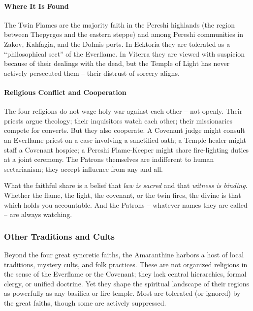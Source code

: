 \paragraph{Where It Is Found}
The Twin Flames are the majority faith in the Pereshi highlands (the region between Thepyrgos and the eastern steppe) and among Pereshi communities in Zakov, Kahfagia, and the Dolmis ports. In Ecktoria they are tolerated as a ``philosophical sect'' of the Everflame. In Viterra they are viewed with suspicion because of their dealings with the dead, but the Temple of Light has never actively persecuted them -- their distrust of sorcery aligns.

\paragraph{Religious Conflict and Cooperation}
The four religions do not wage holy war against each other -- not openly. Their priests argue theology; their inquisitors watch each other; their missionaries compete for converts. But they also cooperate. A Covenant judge might consult an Everflame priest on a case involving a sanctified oath; a Temple healer might staff a Covenant hospice; a Pereshi Flame-Keeper might share fire-lighting duties at a joint ceremony. The Patrons themselves are indifferent to human sectarianism; they accept influence from any and all.

What the faithful share is a belief that \textit{law is sacred} and that \textit{witness is binding}. Whether the flame, the light, the covenant, or the twin fires, the divine is that which holds you accountable. And the Patrons -- whatever names they are called -- are always watching.

\subsubsection{Other Traditions and Cults}
\label{sec:other-religions}

Beyond the four great syncretic faiths, the Amaranthine harbors a host of local traditions, mystery cults, and folk practices. These are not organized religions in the sense of the Everflame or the Covenant; they lack central hierarchies, formal clergy, or unified doctrine. Yet they shape the spiritual landscape of their regions as powerfully as any basilica or fire-temple. Most are tolerated (or ignored) by the great faiths, though some are actively suppressed.

